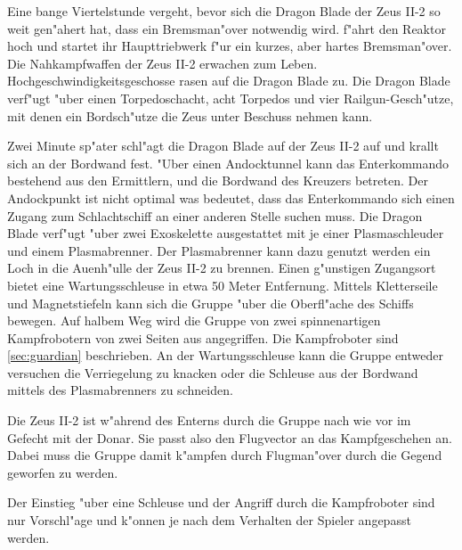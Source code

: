 Eine bange Viertelstunde vergeht, bevor sich die Dragon Blade der Zeus II-2 so weit gen"ahert hat, dass ein Bremsman"over notwendig wird. \xl{} f"ahrt den Reaktor hoch und startet ihr Haupttriebwerk f"ur ein kurzes, aber hartes Bremsman"over. Die Nahkampfwaffen der Zeus II-2 erwachen zum Leben. Hochgeschwindigkeitsgeschosse rasen auf die Dragon Blade zu. Die Dragon Blade verf"ugt "uber einen Torpedoschacht, acht Torpedos und vier Railgun-Gesch"utze, mit denen ein Bordsch"utze die Zeus unter Beschuss nehmen kann.

Zwei Minute sp"ater schl"agt die Dragon Blade auf der Zeus II-2 auf und krallt sich an der Bordwand fest. "Uber einen Andocktunnel kann das Enterkommando bestehend aus den Ermittlern, \xl{} und \ml{} die Bordwand des Kreuzers betreten. Der Andockpunkt ist nicht optimal was bedeutet, dass das Enterkommando sich einen Zugang zum Schlachtschiff an einer anderen Stelle suchen muss. Die Dragon Blade verf"ugt "uber zwei Exoskelette ausgestattet mit je einer Plasmaschleuder und einem Plasmabrenner. Der Plasmabrenner kann dazu genutzt werden ein Loch in die Au\3enh"ulle der Zeus II-2 zu brennen. Einen g"unstigen Zugangsort bietet eine Wartungsschleuse in etwa 50 Meter Entfernung. Mittels Kletterseile und Magnetstiefeln kann sich die Gruppe "uber die Oberfl"ache des Schiffs bewegen. Auf halbem Weg wird die Gruppe von zwei spinnenartigen Kampfrobotern von zwei Seiten aus angegriffen. Die Kampfroboter sind \cref{sec:guardian} beschrieben. An der Wartungsschleuse kann die Gruppe entweder versuchen die Verriegelung zu knacken oder die Schleuse aus der Bordwand mittels des Plasmabrenners zu schneiden.

\begin{remarks}
	Die Zeus II-2 ist w"ahrend des Enterns durch die Gruppe nach wie vor im Gefecht mit der Donar. Sie passt also den Flugvector an das Kampfgeschehen an. Dabei muss die Gruppe damit k"ampfen durch Flugman"over durch die Gegend geworfen zu werden.

	Der Einstieg "uber eine Schleuse und der Angriff durch die Kampfroboter sind nur Vorschl"age und k"onnen je nach dem Verhalten der Spieler angepasst werden.
\end{remarks}

